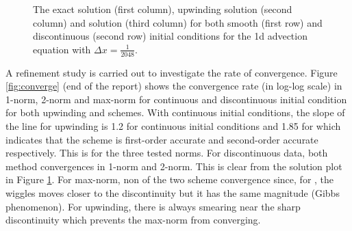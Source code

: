 \begin{figure}[!tbh]
     \caption{The exact solution (first column), upwinding solution (second column) and \protect{\lw} solution (third column) for both smooth (first row) and discontinuous (second row) initial conditions for the 1d advection equation with $\Delta x = \frac{1}{2048}$.}
   \label{fig:sol}
\end{figure} 
   
   
A refinement study is carried out to investigate the rate of convergence. Figure \ref{fig:converge} (end of the report) shows the convergence rate (in log-log scale) in 1-norm, 2-norm and max-norm for continuous and discontinuous initial condition for both upwinding and \protect{\lw} schemes. With continuous initial conditions, the slope of the line for upwinding is 1.2 for continuous initial conditions and 1.85 for \protect{\lw} which indicates that the scheme is first-order accurate and second-order accurate respectively. This is for the three tested norms. For discontinuous data, both method convergences in 1-norm and 2-norm. This is clear from the solution plot in Figure \ref{fig:sol}. For max-norm, non of the two scheme convergence since, for \protect{\lw}, the wiggles moves closer to the discontinuity but it has the same magnitude (Gibbs phenomenon). For upwinding, there is always smearing near the sharp discontinuity which prevents the max-norm from converging. 
   
